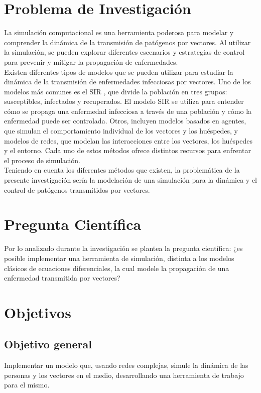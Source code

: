 \section{Problema de Investigación}
La simulación computacional es una herramienta poderosa para modelar y comprender
la dinámica de la transmisión de patógenos por vectores. Al utilizar la simulación,
se pueden explorar diferentes escenarios y estrategias de control para prevenir y mitigar 
la propagación de enfermedades.\autocite{Ferguson2006}\\
Existen diferentes tipos de modelos que se pueden utilizar para estudiar 
la dinámica de la transmisión de enfermedades infecciosas por vectores. Uno
de los modelos más comunes es el SIR 
\autocite{Kermack1927}, que divide la población en tres grupos:
susceptibles, infectados y recuperados. El modelo SIR se utiliza para entender cómo
se propaga una enfermedad infecciosa a través de una población y cómo la enfermedad 
puede ser controlada. Otros, incluyen modelos basados en
agentes, que simulan el comportamiento individual de los vectores y los huéspedes, y
modelos de redes, que modelan las interacciones entre los vectores, los huéspedes y
el entorno. Cada uno de estos métodos ofrece distintos recursos para enfrentar el proceso de simulación.
\autocite{Ferguson2006} \autocite{Balcan2009}\\
Teniendo en cuenta los diferentes métodos que existen, la problemática de la presente
investigación sería la modelación de una simulación para la dinámica y el control de patógenos 
transmitidos por vectores.\\

\section{Pregunta Científica}
Por lo analizado durante la investigación se plantea la pregunta científica: ¿es posible implementar una
herramienta de simulación, distinta a los modelos clásicos de ecuaciones diferenciales, la cual modele 
la propagación de una enfermedad transmitida por vectores?


\section{Objetivos}
\subsection{Objetivo general}
Implementar un modelo que, usando redes complejas, simule la dinámica de las personas y los vectores en el medio, 
desarrollando una herramienta de trabajo para el mismo.

